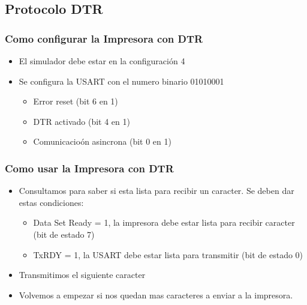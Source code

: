 \documentclass{beamer}
\begin{document}
\subsection{Protocolo DTR}
\begin{frame}[fragile]
\frametitle{Como configurar la Impresora con DTR}
\begin{itemize}
 \item El simulador debe estar en la configuración 4
 \item Se configura la USART con el numero binario 01010001
 \begin{itemize}
 \item Error reset (bit 6 en 1)
 \item DTR activado (bit 4 en 1)
 \item Comunicacioón asincrona (bit 0 en 1)
\end{itemize}
\end{itemize}

\end{frame}


\begin{frame}[fragile]
\frametitle{Como usar la Impresora con DTR}
\begin{itemize}
 \item  Consultamos para saber si esta lista para recibir un caracter. Se deben dar estas condiciones:
 \begin{itemize}
  \item Data Set Ready = 1, la impresora debe estar lista para recibir caracter (bit de estado 7)
  \item TxRDY = 1, la USART debe estar lista para transmitir (bit de estado 0) 
 \end{itemize}
\item Transmitimos el siguiente caracter 
\item Volvemos a empezar si nos quedan mas caracteres a enviar a la impresora.
\end{itemize}

\end{frame}
\end{document}
